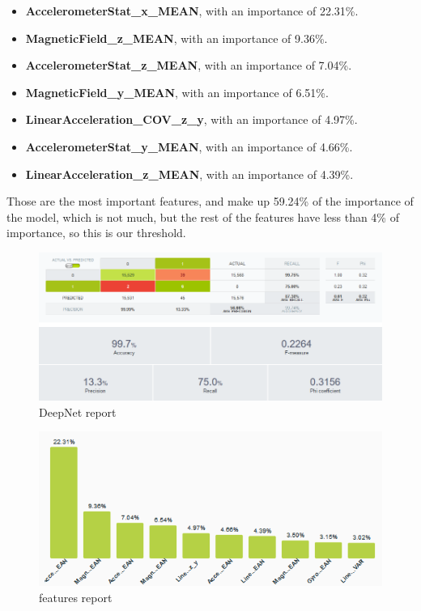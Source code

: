 \documentclass[idxtotoc,hyperref,openany]{labbook} %
\begin{document}
\begin{itemize}
\item \textbf{AccelerometerStat\_x\_MEAN}, with an importance of 22.31\%.
\item \textbf{MagneticField\_z\_MEAN}, with an importance of 9.36\%.
\item \textbf{AccelerometerStat\_z\_MEAN}, with an importance of 7.04\%.
\item \textbf{MagneticField\_y\_MEAN}, with an importance of 6.51\%.
\item \textbf{LinearAcceleration\_COV\_z\_y}, with an importance of 4.97\%.
\item \textbf{AccelerometerStat\_y\_MEAN}, with an importance of 4.66\%.
\item \textbf{LinearAcceleration\_z\_MEAN}, with an importance of 4.39\%.
\end{itemize}

Those are the most important features, and make up 59.24\% of the importance of the model, which is not much, but the rest of the features have less than 4\% of importance, so this is our threshold.



\begin{figure}[h]
\includegraphics[width=0.9\linewidth]{Milestone3/BigML_Result.png}
\setlength\belowcaptionskip{-10pt}
\caption{DeepNet report}
\label{DeepNet Report}
\end{figure}

\begin{figure}[h]
\includegraphics[width=0.9\linewidth]{Milestone3/Feature_Importance.png}
\setlength\belowcaptionskip{-10pt}
\caption{features report}
\label{features Report}
\end{figure}
\end{document}
